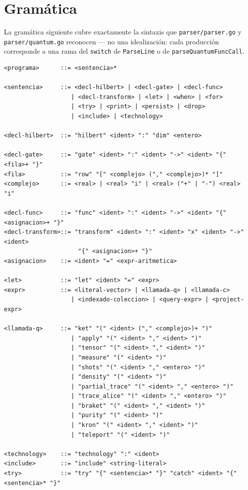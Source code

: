 \documentclass[12pt, a4paper, openany]{report}
\theoremstyle{definition}
\newcommand{\linlangQ}{\textbf{LinLang/Q}}
\begin{document}
\section{Gramática}
\label{sec:gramatica-formal}

La gramática siguiente cubre exactamente la sintaxis que \texttt{parser/parser.go} y \texttt{parser/quantum.go} reconocen — no una idealización: cada producción corresponde a una rama del \texttt{switch} de \texttt{ParseLine} o de \texttt{parseQuantumFuncCall}.

\begin{lstlisting}[caption={Gramática BNF de \linlangQ{} (extensión cuántica)}, label={lst:bnf}]
<programa>      ::= <sentencia>*

<sentencia>     ::= <decl-hilbert> | <decl-gate> | <decl-func>
                   | <decl-transform> | <let> | <when> | <for>
                   | <try> | <print> | <persist> | <drop>
                   | <include> | <technology>

<decl-hilbert>  ::= "hilbert" <ident> ":" "dim" <entero>

<decl-gate>     ::= "gate" <ident> ":" <ident> "->" <ident> "{" <fila>+ "}"
<fila>          ::= "row" "[" <complejo> ("," <complejo>)* "]"
<complejo>      ::= <real> | <real> "i" | <real> ("+" | "-") <real> "i"

<decl-func>     ::= "func" <ident> ":" <ident> "->" <ident> "{" <asignacion>+ "}"
<decl-transform>::= "transform" <ident> ":" <ident> "x" <ident> "->" <ident>
                     "{" <asignacion>+ "}"
<asignacion>    ::= <ident> "=" <expr-aritmetica>

<let>           ::= "let" <ident> "=" <expr>
<expr>          ::= <literal-vector> | <llamada-q> | <llamada-c>
                   | <indexado-coleccion> | <query-expr> | <project-expr>

<llamada-q>     ::= "ket" "(" <ident> ("," <complejo>)+ ")"
                   | "apply" "(" <ident> "," <ident> ")"
                   | "tensor" "(" <ident> "," <ident> ")"
                   | "measure" "(" <ident> ")"
                   | "shots" "(" <ident> "," <entero> ")"
                   | "density" "(" <ident> ")"
                   | "partial_trace" "(" <ident> "," <entero> ")"
                   | "trace_alice" "(" <ident> "," <entero> ")"
                   | "braket" "(" <ident> "," <ident> ")"
                   | "purity" "(" <ident> ")"
                   | "kron" "(" <ident> "," <ident> ")"
                   | "teleport" "(" <ident> ")"

<technology>    ::= "technology" ":" <ident>
<include>       ::= "include" <string-literal>
<try>           ::= "try" "{" <sentencia>* "}" "catch" <ident> "{" <sentencia>* "}"
\end{lstlisting}
\end{document}
